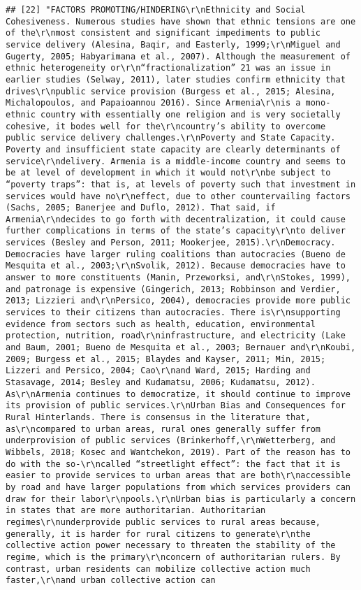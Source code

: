 \documentclass[
]{article}
\begin{document}
\begin{verbatim}
## [22] "FACTORS PROMOTING/HINDERING\r\nEthnicity and Social Cohesiveness. Numerous studies have shown that ethnic tensions are one of the\r\nmost consistent and significant impediments to public service delivery (Alesina, Baqir, and Easterly, 1999;\r\nMiguel and Gugerty, 2005; Habyarimana et al., 2007). Although the measurement of ethnic heterogeneity or\r\n“fractionalization” 21 was an issue in earlier studies (Selway, 2011), later studies confirm ethnicity that drives\r\npublic service provision (Burgess et al., 2015; Alesina, Michalopoulos, and Papaioannou 2016). Since Armenia\r\nis a mono-ethnic country with essentially one religion and is very societally cohesive, it bodes well for the\r\ncountry’s ability to overcome public service delivery challenges.\r\nPoverty and State Capacity. Poverty and insufficient state capacity are clearly determinants of service\r\ndelivery. Armenia is a middle-income country and seems to be at level of development in which it would not\r\nbe subject to “poverty traps”: that is, at levels of poverty such that investment in services would have no\r\neffect, due to other countervailing factors (Sachs, 2005; Banerjee and Duflo, 2012). That said, if Armenia\r\ndecides to go forth with decentralization, it could cause further complications in terms of the state’s capacity\r\nto deliver services (Besley and Person, 2011; Mookerjee, 2015).\r\nDemocracy. Democracies have larger ruling coalitions than autocracies (Bueno de Mesquita et al., 2003;\r\nSvolik, 2012). Because democracies have to answer to more constituents (Manin, Przeworksi, and\r\nStokes, 1999), and patronage is expensive (Gingerich, 2013; Robbinson and Verdier, 2013; Lizzieri and\r\nPersico, 2004), democracies provide more public services to their citizens than autocracies. There is\r\nsupporting evidence from sectors such as health, education, environmental protection, nutrition, road\r\ninfrastructure, and electricity (Lake and Baum, 2001; Bueno de Mesquita et al., 2003; Bernauer and\r\nKoubi, 2009; Burgess et al., 2015; Blaydes and Kayser, 2011; Min, 2015; Lizzeri and Persico, 2004; Cao\r\nand Ward, 2015; Harding and Stasavage, 2014; Besley and Kudamatsu, 2006; Kudamatsu, 2012). As\r\nArmenia continues to democratize, it should continue to improve its provision of public services.\r\nUrban Bias and Consequences for Rural Hinterlands. There is consensus in the literature that, as\r\ncompared to urban areas, rural ones generally suffer from underprovision of public services (Brinkerhoff,\r\nWetterberg, and Wibbels, 2018; Kosec and Wantchekon, 2019). Part of the reason has to do with the so-\r\ncalled “streetlight effect”: the fact that it is easier to provide services to urban areas that are both\r\naccessible by road and have larger populations from which services providers can draw for their labor\r\npools.\r\nUrban bias is particularly a concern in states that are more authoritarian. Authoritarian regimes\r\nunderprovide public services to rural areas because, generally, it is harder for rural citizens to generate\r\nthe collective action power necessary to threaten the stability of the regime, which is the primary\r\nconcern of authoritarian rulers. By contrast, urban residents can mobilize collective action much faster,\r\nand urban collective action can 
\end{verbatim}
\end{document}
